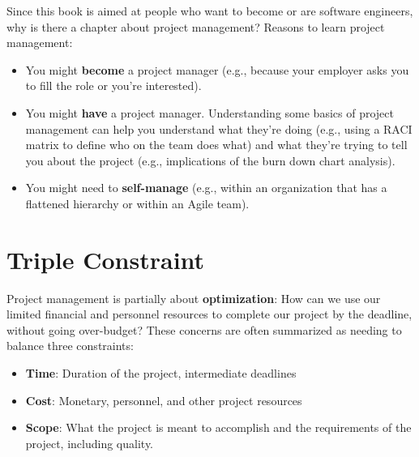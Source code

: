 Since this book is aimed at people who want to become or are software engineers, why is there a chapter about project management? Reasons to learn project management:\\
\begin{itemize}
    \item You might \textbf{become} a project manager (e.g., because your employer asks you to fill the role or you're interested).\\
    \item You might \textbf{have} a project manager. Understanding some basics of project management can help you understand what they're doing (e.g., using a RACI matrix to define who on the team does what) and what they're trying to tell you about the project (e.g., implications of the burn down chart analysis).\\
    \item You might need to \textbf{self-manage} (e.g., within an organization that has a flattened hierarchy or within an Agile team).
\end{itemize}

\section{Triple Constraint}

Project management is partially about \textbf{optimization}: How can we use our limited financial and personnel resources to complete our project by the deadline, without going over-budget? These concerns are often summarized as needing to balance three constraints:

\begin{itemize}
    \item \textbf{Time}: Duration of the project, intermediate deadlines
    \item \textbf{Cost}: Monetary, personnel, and other project resources
    \item \textbf{Scope}: What the project is meant to accomplish and the requirements of the project, including quality.
\end{itemize}

